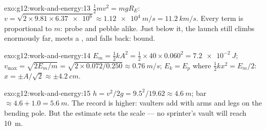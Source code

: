 \begin{solution}{exo:g12:work-and-energy:13}
$\tfrac12 mv^2 = mgR_E$:
$v = \sqrt{2 \times 9.81 \times \num{6.37e6}} \approx \qty{1.12e4}{m/s}
= \qty{11.2}{km/s}$. Every term is proportional to $m$: probe and
pebble alike. Just below it, the launch still climbs enormously far,
meets a , and falls back: bound.
\end{solution}

\begin{solution}{exo:g12:work-and-energy:14}
$E_m = \tfrac12 kA^2 = \tfrac12 \times 40 \times 0.060^2 =
\qty{7.2e-2}{J}$; $v_{\max} = \sqrt{2E_m/m} =
\sqrt{2 \times 0.072/0.250} \approx \qty{0.76}{m/s}$;
$E_k = E_p$ where $\tfrac12 kx^2 = E_m/2$: $x = \pm A/\sqrt 2 \approx
\pm\qty{4.2}{cm}$.
\end{solution}

\begin{solution}{exo:g12:work-and-energy:15}
$h = v^2/2g = 9.5^2/19.62 \approx \qty{4.6}{m}$; bar $\approx
4.6 + 1.0 = \qty{5.6}{m}$. The record is higher: vaulters add 
with arms and legs on the bending pole. But the  estimate sets
the scale --- no sprinter's vault will reach \qty{10}{m}.
\end{solution}

